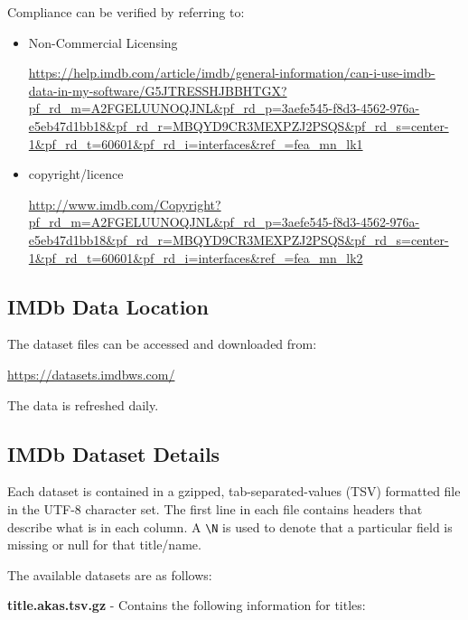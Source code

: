 \documentclass[11pt]{article}
\begin{document}
    Compliance can be verified by referring to:
    \begin{itemize}

        \item Non-Commercial Licensing

        \url{https://help.imdb.com/article/imdb/general-information/can-i-use-imdb-data-in-my-software/G5JTRESSHJBBHTGX?pf_rd_m=A2FGELUUNOQJNL&pf_rd_p=3aefe545-f8d3-4562-976a-e5eb47d1bb18&pf_rd_r=MBQYD9CR3MEXPZJ2PSQS&pf_rd_s=center-1&pf_rd_t=60601&pf_rd_i=interfaces&ref_=fea_mn_lk1}

        \item copyright/licence

        \url{http://www.imdb.com/Copyright?pf_rd_m=A2FGELUUNOQJNL&pf_rd_p=3aefe545-f8d3-4562-976a-e5eb47d1bb18&pf_rd_r=MBQYD9CR3MEXPZJ2PSQS&pf_rd_s=center-1&pf_rd_t=60601&pf_rd_i=interfaces&ref_=fea_mn_lk2}

    \end{itemize}

    \subsection{IMDb Data Location} \label{subsec:imdb_data_loc}

    The dataset files can be accessed and downloaded from:

    \url{https://datasets.imdbws.com/}

    The data is refreshed daily.

    \subsection{IMDb Dataset Details} \label{subsec:imdb_data_desc}

    Each dataset is contained in a gzipped, tab-separated-values (TSV) formatted file in the UTF-8 character set.
    The first line in each file contains headers that describe what is in each column.
    A \texttt{\textbackslash N} is used to denote that a particular field is missing or null for that title/name.

    \vspace{5mm}
    The available datasets are as follows:
    \vspace{5mm}

    \textbf{title.akas.tsv.gz} - Contains the following information for titles:
\end{document}
